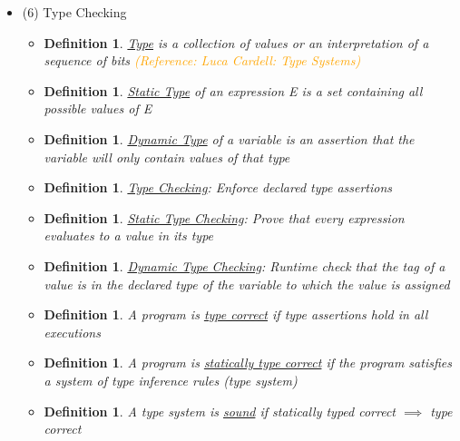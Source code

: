 \documentclass{article}
\newtheorem{ex}[theorem]{Example}
\newtheorem{definition}[theorem]{Definition}
\begin{document}
\begin{itemize}
\begin{itemize}
\begin{ex}
\begin{itemize}
\item a.b //look for a field named b in a 
\item a.b(c) //Look for method named b in contain(type of a). Use type of c to select among  overloaded methods
\end{itemize}
\end{ex}
\end{itemize}
\item (6) Type Checking 
\begin{itemize}
\item \begin{definition} \underline{Type} is a collection of values or an interpretation of a sequence of bits \textcolor{orange}{(Reference: Luca Cardell: Type Systems)} 
\end{definition}
\item \begin{definition} \underline{Static Type}  of an expression E is a set containing all possible values of E
\end{definition}
\item \begin{definition} \underline{Dynamic Type} of a variable is an assertion that the variable will only contain values of that type
\end{definition}
\item \begin{definition} \underline{Type Checking}: Enforce declared type assertions
\end{definition}
\item \begin{definition} \underline{Static Type Checking}: Prove that every expression evaluates to a value in its type
\end{definition}
\item \begin{definition} \underline{Dynamic Type Checking}: Runtime check that the tag of a value is in the declared type of the variable to which the value is assigned
\end{definition}
\item \begin{definition} A program is \underline{type correct} if type assertions hold in all executions 
\end{definition}
\item \begin{definition} A program is \underline{statically type correct} if the program satisfies  a system of type inference rules (type system)
\end{definition}
\item \begin{definition} A type system  is \underline{sound} if statically typed correct \(\implies\) type correct
\end{definition} 
\end{itemize}
\end{itemize}
\end{document}
